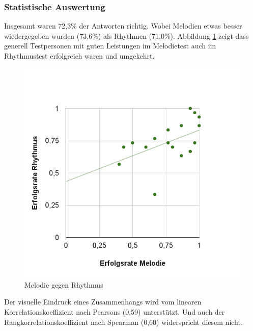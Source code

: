 \documentclass{acm_proc_article-sp}
\begin{document}
\subsubsection{Statistische Auswertung}
Insgesamt waren 72,3\% der Antworten richtig. Wobei Melodien etwas besser wiedergegeben wurden (73,6\%) als Rhythmen (71,0\%). Abbildung \ref{MelodieGegenRhythmus} zeigt dass generell Testpersonen mit guten Leistungen im Melodietest auch im Rhythmustest erfolgreich waren und umgekehrt.
\begin{figure}[H]
\includegraphics[width=1.0\linewidth]{Abbildungen/Melodie-Rhythmus.png}
\caption{Melodie gegen Rhythmus}
\label{MelodieGegenRhythmus}
\end{figure}
Der visuelle Eindruck eines Zusammenhangs wird vom linearen Korrelationskoeffizient nach Pearsons \cite{wiki:korrelationskoeffizient} (0,59) unterstützt. Und auch der Rangkorrelationskoeffizient nach Spearman \cite{wiki:rangkorrelationskoeffizient} (0,60) widerspricht diesem nicht.\\
\end{document}
